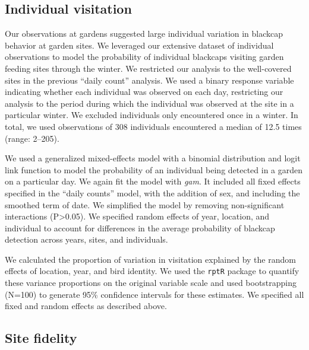 \documentclass[a4paper, nobind]{templates/ociamthesis}
\begin{document}
\hypertarget{individual-visitation}{%
\subsection{Individual visitation}\label{individual-visitation}}

Our observations at gardens suggested large individual variation in blackcap behavior at garden sites. We leveraged our extensive dataset of individual observations to model the probability of individual blackcaps visiting garden feeding sites through the winter. We restricted our analysis to the well-covered sites in the previous ``daily count'' analysis. We used a binary response variable indicating whether each individual was observed on each day, restricting our analysis to the period during which the individual was observed at the site in a particular winter. We excluded individuals only encountered once in a winter. In total, we used observations of 308 individuals encountered a median of 12.5 times (range: 2--205).

We used a generalized mixed-effects model with a binomial distribution and logit link function to model the probability of an individual being detected in a garden on a particular day. We again fit the model with \emph{gam}. It included all fixed effects specified in the ``daily counts'' model, with the addition of sex, and including the smoothed term of date.
We simplified the model by removing non-significant interactions (P\textgreater0.05). We specified random effects of year, location, and individual to account for differences in the average probability of blackcap detection across years, sites, and individuals.

We calculated the proportion of variation in visitation explained by the random effects of location, year, and bird identity. We used the \texttt{rptR} package \autocite{stoffelRptRRepeatabilityEstimation2017} to quantify these variance proportions on the original variable scale and used bootstrapping (N=100) to generate 95\% confidence intervals for these estimates. We specified all fixed and random effects as described above.

\hypertarget{site-fidelity}{%
\subsection{Site fidelity}\label{site-fidelity}}
\end{document}
